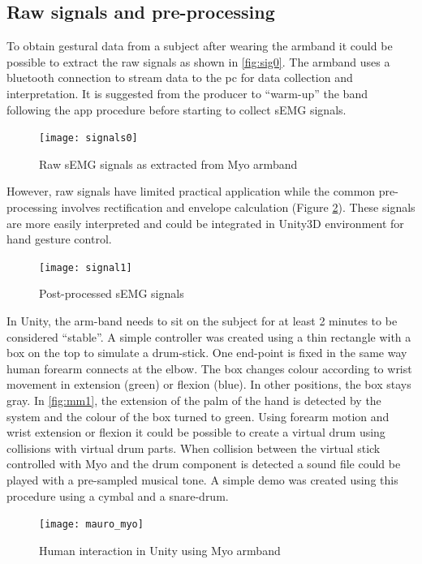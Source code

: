 \documentclass{vgtc}
\begin{document}
\subsection{Raw signals and pre-processing}
To obtain gestural data from a subject after wearing the armband it could be possible to extract the raw signals as shown in \autoref{fig:sig0}. The armband uses a bluetooth connection to stream data to the pc for data collection and interpretation. It is suggested from the producer to “warm-up” the band following the app procedure before starting to collect sEMG signals.
\begin{figure}[h]
\texttt{[image: signals0]}
\caption{Raw sEMG signals as extracted from Myo armband}
\centering
\label{fig:sig0}
\end{figure}
However, raw signals have limited practical application while the common pre-processing involves rectification and envelope calculation (Figure \ref{fig:sig1}). These signals are more easily interpreted and could be integrated in Unity3D environment for hand gesture control. 
\begin{figure}[h]
\texttt{[image: signal1]}
\caption{Post-processed sEMG signals}
\centering
\label{fig:sig1}
\end{figure}
In Unity, the arm-band needs to sit on the subject for at least 2 minutes to be considered “stable”. A simple controller was created using a thin rectangle with a box on the top to simulate a drum-stick. One end-point is fixed in the same way human forearm connects at the elbow. The box changes colour according to wrist movement in extension (green) or flexion (blue). In other positions, the box stays gray. In \autoref{fig:mm1}, the extension of the palm of the hand is detected by the system and the colour of the box turned to green. Using forearm motion and wrist extension or flexion it could be possible to create a virtual drum using collisions with virtual drum parts. When collision between the virtual stick controlled with Myo and the drum component is detected a sound file could be played with a pre-sampled musical tone. A simple demo was created using this procedure using a cymbal and a snare-drum.
\begin{figure}[h]
\texttt{[image: mauro\_myo]}
\caption{Human interaction in Unity using Myo armband}
\centering
\label{fig:mm1}
\end{figure}
\end{document}
